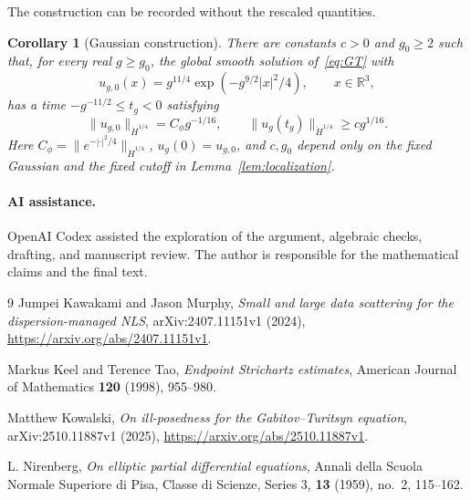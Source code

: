 \documentclass[11pt]{article}
\newcommand{\R}{\mathbb R}
\numberwithin{equation}{section}
\newtheorem{corollary}{Corollary}[section]
\begin{document}
The construction can be recorded without the rescaled quantities.
\begin{corollary}[Gaussian construction]\label{cor:construction}
There are constants $c>0$ and $g_0\ge2$ such that, for every real $g\ge g_0$,
the global smooth solution of~\eqref{eq:GT} with
\[
 u_{g,0}(x)=g^{11/4}\exp(-g^{9/2}|x|^2/4),\qquad x\in\R^3,
\]
has a time $-g^{-11/2}\le t_g<0$ satisfying
\[
 \|u_{g,0}\|_{\dot H^{1/4}}=C_\phi g^{-1/16},\qquad
 \|u_g(t_g)\|_{\dot H^{1/4}}\ge cg^{1/16}.
\]
Here $C_\phi=\|e^{-|\cdot|^2/4}\|_{\dot H^{1/4}}$, $u_g(0)=u_{g,0}$,
and $c,g_0$ depend only on the fixed Gaussian and the fixed cutoff in
Lemma~\ref{lem:localization}.
\end{corollary}

\paragraph{AI assistance.}
OpenAI Codex assisted the exploration of the argument, algebraic checks,
drafting, and manuscript review. The author is responsible for the mathematical
claims and the final text.

\begin{thebibliography}{9}
Jumpei Kawakami and Jason Murphy,
\emph{Small and large data scattering for the dispersion-managed NLS},
arXiv:2407.11151v1 (2024),
\url{https://arxiv.org/abs/2407.11151v1}.

Markus Keel and Terence Tao,
\emph{Endpoint Strichartz estimates},
American Journal of Mathematics \textbf{120} (1998), 955--980.

Matthew Kowalski,
\emph{On ill-posedness for the Gabitov--Turitsyn equation},
arXiv:2510.11887v1 (2025),
\url{https://arxiv.org/abs/2510.11887v1}.

L. Nirenberg,
\emph{On elliptic partial differential equations},
Annali della Scuola Normale Superiore di Pisa, Classe di Scienze,
Series 3, \textbf{13} (1959), no.~2, 115--162.
\end{thebibliography}
\end{document}
